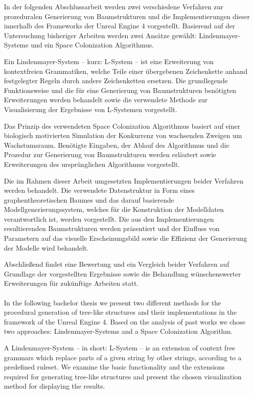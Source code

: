 \kurzfassung

In der folgenden Abschlussarbeit werden zwei verschiedene Verfahren zur prozeduralen Generierung von Baumstrukturen und die Implementierungen dieser innerhalb des Frameworks der Unreal Engine 4 vorgestellt. Basierend auf der Untersuchung bisheriger Arbeiten werden zwei Ansätze gewählt: Lindenmayer-Systeme und ein Space Colonization Algorithmus.

Ein Lindenmayer-System -- kurz: L-System -- ist eine Erweiterung von kontextfreien Grammatiken, welche Teile einer übergebenen Zeichenkette anhand festgelegter Regeln durch andere Zeichenketten ersetzen. \cite[S.2]{ABOP:04} Die grundlegende Funktionsweise und die für eine Generierung von Baumstrukturen benötigten Erweiterungen werden behandelt sowie die verwendete Methode zur Visualisierung der Ergebnisse von L-Systemen vorgestellt.

Das Prinzip des verwendeten Space Colonization Algorithmus basiert auf einer biologisch motivierten Simulation der Konkurrenz von wachsenden Zweigen um Wachstumsraum. \cite[S.2f]{SpaceColonizationAlgorithm:07} Benötigte Eingaben, der Ablauf des Algorithmus und die Prozedur zur Generierung von Baumstrukturen werden erläutert sowie Erweiterungen des ursprünglichen Algorithmus vorgestellt.

Die im Rahmen dieser Arbeit umgesetzten Implementierungen beider Verfahren werden behandelt. Die verwendete Datenstruktur in Form eines graphentheoretischen Baumes und das darauf basierende Modellgenerierungssystem, welches für die Konstruktion der Modelldaten verantwortlich ist, werden vorgestellt. Die aus den Implementierungen resultierenden Baumstrukturen werden präsentiert und der Einfluss von Parametern auf das visuelle Erscheinungsbild sowie die Effizienz der Generierung der Modelle wird behandelt. 

Abschließend findet eine Bewertung und ein Vergleich beider Verfahren auf Grundlage der vorgestellten Ergebnisse sowie die Behandlung wünschenswerter Erweiterungen für zukünftige Arbeiten statt.
 \\
 \\
 
 In the following bachelor thesis we present two different methods for the procedural generation of tree-like structures and their implementations in the framework of the Unreal Engine 4. Based on the analysis of past works we chose two approaches: Lindenmayer-Systems and a Space Colonization Algorithm.
 
 A Lindenmayer-System -- in short: L-System -- is an extension of context free grammars which replace parts of a given string by other strings, according to a predefined ruleset. \cite[S.2]{ABOP:04} We examine the basic functionality and the extensions required for generating  tree-like structures and present the chosen visualization method for displaying the results.
 
